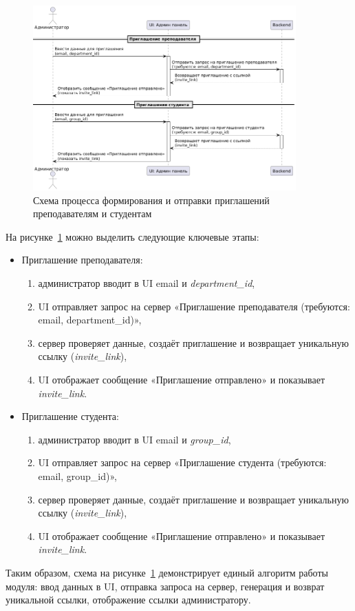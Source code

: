 \begin{figure}[h]
    \centering
    \includegraphics[width=0.9\textwidth]{static/diagrams/Admin.png}
    \caption{Схема процесса формирования и отправки приглашений преподавателям и студентам}
    \label{fig:admin-invite}
\end{figure}

На рисунке~\ref{fig:admin-invite} можно выделить следующие ключевые этапы:
\begin{itemize}
    \item Приглашение преподавателя:
    \begin{enumerate}
        \item администратор вводит в UI email и \textit{department\_id},
        \item UI отправляет запрос на сервер «Приглашение преподавателя (требуются: email, department\_id)»,
        \item сервер проверяет данные, создаёт приглашение и возвращает уникальную ссылку (\textit{invite\_link}),
        \item UI отображает сообщение «Приглашение отправлено» и показывает \textit{invite\_link}.
    \end{enumerate}
    \item Приглашение студента:
    \begin{enumerate}
        \item администратор вводит в UI email и \textit{group\_id},
        \item UI отправляет запрос на сервер «Приглашение студента (требуются: email, group\_id)»,
        \item сервер проверяет данные, создаёт приглашение и возвращает уникальную ссылку (\textit{invite\_link}),
        \item UI отображает сообщение «Приглашение отправлено» и показывает \textit{invite\_link}.
    \end{enumerate}
\end{itemize}

Таким образом, схема на рисунке~\ref{fig:admin-invite} демонстрирует единый алгоритм работы модуля: ввод данных в UI, отправка запроса на сервер, генерация и возврат уникальной ссылки, отображение ссылки администратору.
